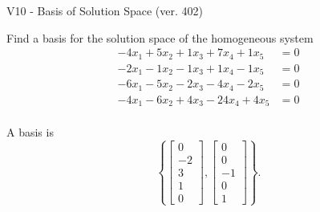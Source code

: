 \begin{exercise}
  \begin{exerciseTitle}V10 - Basis of Solution Space (ver. 402)\end{exerciseTitle}
  \begin{exerciseStatement}
    Find a basis for the solution space of the homogeneous system 
\begin{align*}
 -4 x_ 1 + 5 x_ 2 + 1 x_ 3 + 7 x_ 4 + 1 x_ 5 &= 0  \\ 
  -2 x_ 1 -1 x_ 2 -1 x_ 3 + 1 x_ 4 -1 x_ 5 &= 0  \\ 
  -6 x_ 1 -5 x_ 2 -2 x_ 3 -4 x_ 4 -2 x_ 5 &= 0  \\ 
  -4 x_ 1 -6 x_ 2 + 4 x_ 3 -24 x_ 4 + 4 x_ 5 &= 0  \\ 
 \end{align*}


 
  \end{exerciseStatement}

  \begin{exerciseAnswer}
   A basis is   
\[\left\{\left[\begin{array}{c}
0 \\
-2 \\
3 \\
1 \\
0
\end{array}\right] , \left[\begin{array}{c}
0 \\
0 \\
-1 \\
0 \\
1
\end{array}\right]\right\}.\]

  


  \end{exerciseAnswer}
\end{exercise}